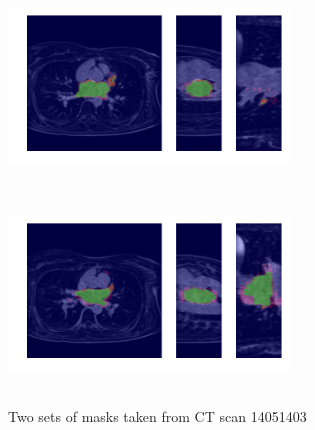\begin{figure}[H]
\centering
\label{final_model}
\begin{minipage}{0.45\textwidth}
\centering
{\includegraphics[trim=0cm 2cm 0cm 2cm, clip=true, height=50mm, width=75mm]{Appendix/img/Masks_for_14051403_0.png}}
\end{minipage}\hfill
\begin{minipage}{0.45\textwidth}
\centering
{\includegraphics[trim=0cm 2cm 0cm 2cm, clip=true, height=50mm, width=75mm]{Appendix/img/Masks_for_14051403_1.png}}
\end{minipage}
\caption{Two sets of masks taken from CT scan 14051403}
\end{figure}

